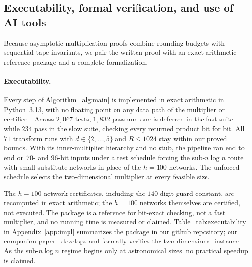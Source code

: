\subsection{Executability, formal verification, and use of AI tools}\label{sec:intro-verification}

Because asymptotic multiplication proofs combine rounding budgets with sequential tape invariants, we pair the written proof with an exact-arithmetic reference package and a complete formalization.

\paragraph{Executability.}
Every step of Algorithm~\ref{alg:main} is implemented in exact arithmetic in Python~3.13, with no floating point on any data path of the multiplier or certifier~\cite{Code26}. Across $2{,}067$ tests, $1{,}832$ pass and one is deferred in the fast suite while $234$ pass in the slow suite, checking every returned product bit for bit. All $71$ transform runs with $d\in\{2,\dots,5\}$ and $R\le 1024$ stay within our proved bounds. With its inner-multiplier hierarchy and no stub, the pipeline ran end to end on $70$- and $96$-bit inputs under a test schedule forcing the sub-$n\log n$ route with small substitute networks in place of the $h=100$ networks. The unforced schedule selects the two-dimensional multiplier at every feasible size.

The $h=100$ network certificates, including the $140$-digit guard constant, are recomputed in exact arithmetic; the $h=100$ networks themselves are certified, not executed. The package is a reference for bit-exact checking, not a fast multiplier, and no running time is measured or claimed. Table~\ref{tab:executability} in Appendix~\ref{app:impl} summarizes the package in our \href{https://github.com/lockqueue/intmul}{github repository}; our companion paper~\cite{MS} develops and formally verifies the two-dimensional instance. As the sub-$n\log n$ regime begins only at astronomical sizes, no practical speedup is claimed.

